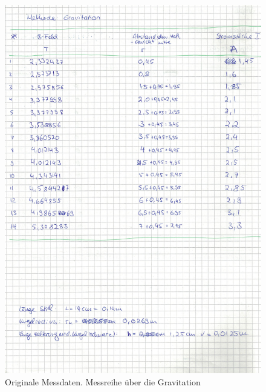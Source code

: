 \begin{figure}
  \centering
  \includegraphics[width=\textwidth]{OMDGrav.pdf}
  \caption{Originale Messdaten. Messreihe über die Gravitation}
  \label{OMDGrav}
\end{figure}

